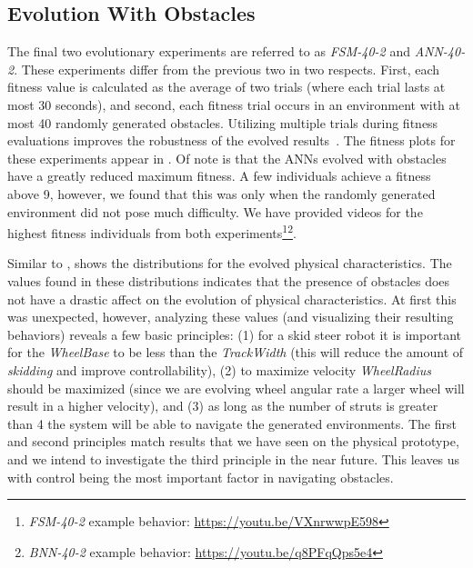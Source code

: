 \subsection{Evolution With Obstacles}



The final two evolutionary experiments are referred to as \emph{FSM-40-2} and \emph{ANN-40-2}.
%
These experiments differ from the previous two in two respects. First, each fitness value is calculated as the average of two trials (where each trial lasts at most 30 seconds), and second, each fitness trial occurs in an environment with at most 40 randomly generated obstacles.
%
Utilizing multiple trials during fitness evaluations improves the robustness of the evolved results~\autocite{Ruud.SSCI.EvoLearn.2016}.
%
The fitness plots for these experiments appear in .
%
Of note is that the ANNs evolved with obstacles have a greatly reduced maximum fitness. A few individuals achieve a fitness above 9, however, we found that this was only when the randomly generated environment did not pose much difficulty.
%
We have provided videos for the highest fitness individuals from both experiments\footnote{\emph{FSM-40-2} example behavior: \url{https://youtu.be/VXnrwwpE598}}\footnote{\emph{BNN-40-2} example behavior: \url{https://youtu.be/q8PFqQps5e4}}.


Similar to ,  shows the distributions for the evolved physical characteristics.
%
The values found in these distributions indicates that the presence of obstacles does not have a drastic affect on the evolution of physical characteristics.
%
At first this was unexpected, however, analyzing these values (and visualizing their resulting behaviors) reveals a few basic principles:
(1) for a skid steer robot it is important for the \emph{WheelBase} to be less than the \emph{TrackWidth} (this will reduce the amount of \emph{skidding} and improve controllability),
(2) to maximize velocity \emph{WheelRadius} should be maximized (since we are evolving wheel angular rate a larger wheel will result in a higher velocity), and
(3) as long as the number of struts is greater than 4 the system will be able to navigate the generated environments.
%
The first and second principles match results that we have seen on the physical prototype, and we intend to investigate the third principle in the near future.
%
This leaves us with control being the most important factor in navigating obstacles.


